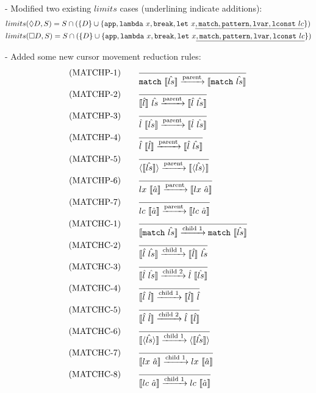 \documentclass[10pt,a4paper,english]{article}
\newcommand\match[1]{\texttt{match}~#1}
\begin{document}
- Modified two existing $limits$ cases (underlining indicate additions):
\begin{align}
&limits(\Diamond D, S) = S \cap (\{D\} \cup \{\texttt{app}, \texttt{lambda}~x, \texttt{break}, \texttt{let}~x \underline{, \texttt{match}, \texttt{pattern}, \texttt{lvar}, \texttt{lconst}~lc}\})\\
&limits(\Box D, S) = S \cap (\{D\} \cup \{\texttt{app}, \texttt{lambda}~x, \texttt{break}, \texttt{let}~x \underline{, \texttt{match}, \texttt{pattern}, \texttt{lvar}, \texttt{lconst}~lc} \})
\end{align}





- Added some new cursor movement reduction rules:
\begin{align}
(\text{MATCHP-1}) \qquad &\frac{}{\match{\cursor{\hat{ls}}}\transition{parent}\cursor{\match{\hat{ls}}}}\\
(\text{MATCHP-2}) \qquad &\frac{}{\cursor{\hat{l}}~\hat{ls}\transition{parent}\cursor{\hat{l}~\hat{ls}}}\\
(\text{MATCHP-3}) \qquad &\frac{}{\hat{l}~\cursor{\hat{ls}}\transition{parent}\cursor{\hat{l}~\hat{ls}}}\\
(\text{MATCHP-4}) \qquad &\frac{}{\hat{l}~\cursor{\hat{l}}\transition{parent}\cursor{\hat{l}~\hat{ls}}}\\
(\text{MATCHP-5}) \qquad &\frac{}{\breakpoint{\cursor{\hat{ls}}}\transition{parent}\cursor{\breakpoint{\hat{ls}}}}\\
(\text{MATCHP-6}) \qquad &\frac{}{lx~\cursor{\hat{a}}\transition{parent}\cursor{lx~\hat{a}}}\\
(\text{MATCHP-7}) \qquad &\frac{}{lc~\cursor{\hat{a}}\transition{parent}\cursor{lc~\hat{a}}}\\
(\text{MATCHC-1}) \qquad &\frac{}{\cursor{\match{\hat{ls}}}\transition{child~1}\match{\cursor{\hat{ls}}}}\\
(\text{MATCHC-2}) \qquad &\frac{}{\cursor{\hat{l}~\hat{ls}}\transition{child~1}\cursor{\hat{l}}~\hat{ls}}\\
(\text{MATCHC-3}) \qquad &\frac{}{\cursor{\hat{l}~\hat{ls}}\transition{child~2}\hat{l}~\cursor{\hat{ls}}}\\
(\text{MATCHC-4}) \qquad &\frac{}{\cursor{\hat{l}~\hat{l}}\transition{child~1}\cursor{\hat{l}}~\hat{l}}\\
(\text{MATCHC-5}) \qquad &\frac{}{\cursor{\hat{l}~\hat{l}}\transition{child~2}\hat{l}~\cursor{\hat{l}}}\\
(\text{MATCHC-6}) \qquad &\frac{}{\cursor{\breakpoint{\hat{ls}}}\transition{child~1}\breakpoint{\cursor{\hat{ls}}}}\\
(\text{MATCHC-7}) \qquad &\frac{}{\cursor{lx~\hat{a}}\transition{child~1}lx~\cursor{\hat{a}}}\\
(\text{MATCHC-8}) \qquad &\frac{}{\cursor{lc~\hat{a}}\transition{child~1}lc~\cursor{\hat{a}}}
\end{align}
\end{document}
